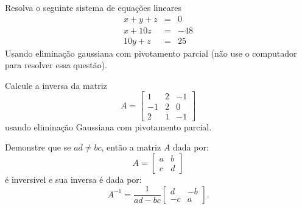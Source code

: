 \begin{Exercise} Resolva o seguinte sistema de equações lineares
\begin{eqnarray*}
x+y+z&=&0\\
x+10z&=&-48\\
10y+z&=&25
\end{eqnarray*} Usando eliminação gaussiana com pivotamento parcial (não use o computador para resolver essa questão).
\end{Exercise}

\begin{Exercise}Calcule a inversa da matriz
$$
A=\left[\begin{array}{ccc}
1&2&-1\\
-1&2&0\\
2&1&-1
\end{array}
\right]
$$
usando eliminação Gaussiana com pivotamento parcial.
\end{Exercise}

\begin{Exercise} \label{inv22} Demonstre que se $ad\neq bc$, então a matriz $A$ dada por:
$$A=\left[\begin{array}{cc}a&b\\c&d\end{array}\right]$$
é inversível e sua inversa é dada por:
$$A^{-1}= \frac{1}{ad-bc} \left[\begin{array}{cc}d&-b\\-c&a\end{array}\right].$$
\end{Exercise}

